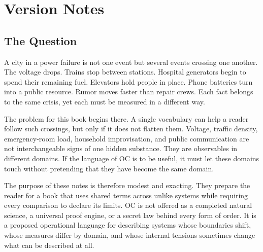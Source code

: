 \documentclass[11pt,a4paper,openany]{book}
\begin{document}
\section{Version Notes}
\subsection{The Question}
A city in a power failure is not one event but several events crossing one another. The voltage drops. Trains stop between stations. Hospital generators begin to spend their remaining fuel. Elevators hold people in place. Phone batteries turn into a public resource. Rumor moves faster than repair crews. Each fact belongs to the same crisis, yet each must be measured in a different way. \cite{kauffman_autocatalytic,raf_networks}\par
The problem for this book begins there. A single vocabulary can help a reader follow such crossings, but only if it does not flatten them. Voltage, traffic density, emergency-room load, household improvisation, and public communication are not interchangeable signs of one hidden substance. They are observables in different domains. If the language of OC is to be useful, it must let these domains touch without pretending that they have become the same domain.\par
The purpose of these notes is therefore modest and exacting. They prepare the reader for a book that uses shared terms across unlike systems while requiring every comparison to declare its limits. OC is not offered as a completed natural science, a universal proof engine, or a secret law behind every form of order. It is a proposed operational language for describing systems whose boundaries shift, whose measures differ by domain, and whose internal tensions sometimes change what can be described at all.\par
\end{document}
